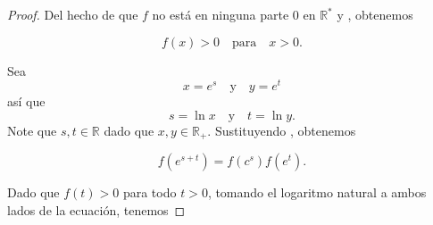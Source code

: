 \begin{theorem}
\begin{proof}
Del hecho de que $f$ no está en ninguna parte 0 en $\mathbb{R}^{\ast}$ y %
, obtenemos

\[f(x)>0\quad\text{para}\quad x>0.\]

Sea
\[x=e^{s}\quad\text{y}\quad y=e^{t}\]
así que
\[s=\ln x\quad\text{y}\quad t=\ln y.\]
Note que $s,t\in\mathbb{R}$ dado que $x,y\in\mathbb{R}_{+}$. Sustituyendo %
, obtenemos

\[f\left(e^{s+t}\right)=f\left(c^{s}\right)f\left(e^{t}\right).\]

Dado que $f(t)>0$ para todo $t>0$, tomando el logaritmo natural a ambos lados de la ecuación, tenemos
\end{proof}
\end{theorem}
